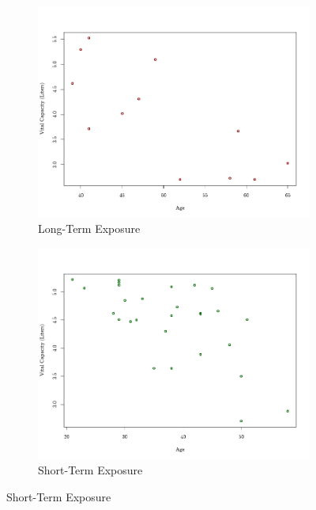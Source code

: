 \documentclass{article}
\begin{document}
		\begin{figure}[h!]
			\centering
			\begin{subfigure}[b]{0.3\textwidth}
				\includegraphics[width=\textwidth]{graphs/ScatterLongExp.png}
				\caption{Long-Term Exposure}
				\label{fig:img1}
			\end{subfigure}
			\hspace{0.05\textwidth} %
			\begin{subfigure}[b]{0.3\textwidth}
				\includegraphics[width=\textwidth]{graphs/ScatterShortExp.png}
				\caption{Short-Term Exposure}
				\label{fig:img2}
			\end{subfigure}

\end{figure}
\end{document}
